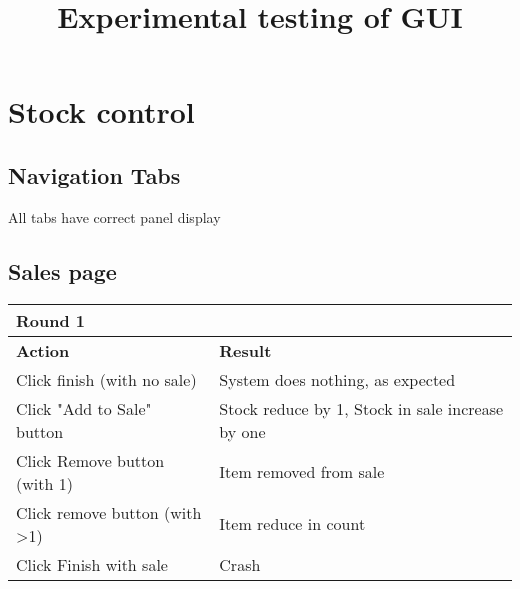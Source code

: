 \documentclass[11pt,a4paper]{article}
\begin{document}
	\title{Experimental testing of GUI}
	\section{Stock control}
	\subsection{Navigation Tabs}
	All tabs have correct panel display
	
	\subsection{Sales page}
	\begin{tabular}{|m{7cm}|m{7cm}|}
		\hline Round 1&\\
		\hline \textbf{Action} & \textbf{Result}\\
		\hline Click finish (with no sale) & System does nothing, as expected\\
		\hline  Click "Add to Sale" button& Stock reduce by 1, Stock in sale increase by one\\
		\hline Click Remove button (with 1)& Item removed from sale\\
		\hline  Click remove button (with >1) & Item reduce in count\\
		\hline Click Finish with sale& Crash \\
			\hline 
		\end{tabular}
\end{document}
